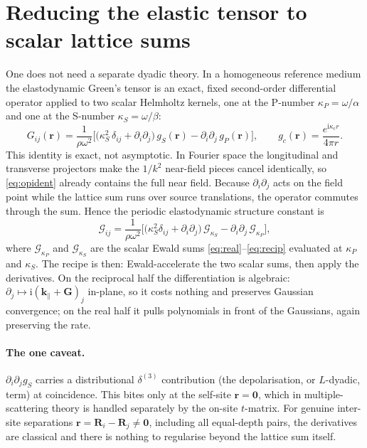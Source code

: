 \documentclass[11pt,a4paper]{article}
\newcommand{\ii}{\mathrm{i}}
\newcommand{\kpar}{\mathbf{k}_{\parallel}}
\newcommand{\vr}{\mathbf{r}}
\newcommand{\vR}{\mathbf{R}}
\newcommand{\vG}{\mathbf{G}}
\begin{document}
\section{Reducing the elastic tensor to scalar lattice sums}

One does not need a separate dyadic theory. In a homogeneous reference medium the
elastodynamic Green's tensor is an exact, fixed second-order differential operator applied
to two scalar Helmholtz kernels, one at the P-number $\kappa_P=\omega/\alpha$ and one at the
S-number $\kappa_S=\omega/\beta$:
\begin{equation}
\label{eq:opident}
G_{ij}(\vr)
=
\frac{1}{\rho\omega^{2}}
\Big[\big(\kappa_S^{2}\,\delta_{ij}+\partial_i\partial_j\big)\,g_S(\vr)
-\partial_i\partial_j\,g_P(\vr)\Big],
\qquad
g_c(\vr)=\frac{e^{\ii\kappa_c r}}{4\pi r}.
\end{equation}
This identity is exact, not asymptotic. In Fourier space the longitudinal and transverse
projectors make the $1/k^{2}$ near-field pieces cancel identically, so \eqref{eq:opident}
already contains the full near field. Because $\partial_i\partial_j$ acts on the field point
while the lattice sum runs over source translations, the operator commutes through the sum.
Hence the periodic elastodynamic structure constant is
\begin{equation}
\label{eq:tensorperiodic}
\mathcal{G}_{ij}
=
\frac{1}{\rho\omega^{2}}
\Big[\big(\kappa_S^{2}\delta_{ij}+\partial_i\partial_j\big)\,\mathcal{G}_{\kappa_S}
-\partial_i\partial_j\,\mathcal{G}_{\kappa_P}\Big],
\end{equation}
where $\mathcal{G}_{\kappa_P}$ and $\mathcal{G}_{\kappa_S}$ are the scalar Ewald sums
\eqref{eq:real}--\eqref{eq:recip} evaluated at $\kappa_P$ and $\kappa_S$. The recipe is then:
Ewald-accelerate the two scalar sums, then apply the derivatives. On the reciprocal half the
differentiation is algebraic: $\partial_j\mapsto \ii(\kpar+\vG)_j$ in-plane, so it costs
nothing and preserves Gaussian convergence; on the real half it pulls polynomials in front of
the Gaussians, again preserving the rate.

\paragraph{The one caveat.} $\partial_i\partial_j g_S$ carries a distributional
$\delta^{(3)}$ contribution (the depolarisation, or $L$-dyadic, term) at coincidence. This
bites only at the self-site $\vr=\mathbf 0$, which in multiple-scattering theory is handled
separately by the on-site $t$-matrix. For genuine inter-site separations
$\vr=\vR_i-\vR_j\neq\mathbf 0$, including all equal-depth pairs, the derivatives are classical
and there is nothing to regularise beyond the lattice sum itself.
\end{document}
